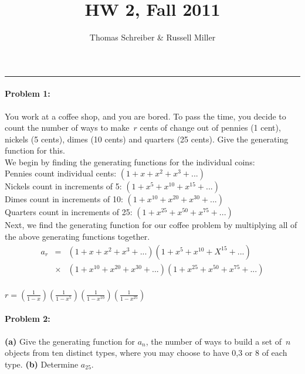 \documentclass{article}
\author{Thomas Schreiber \& Russell Miller}
\title{HW 2, Fall 2011}
\begin{document}
\maketitle
\begin{center}
\hrule
\end{center}
\vspace*{1ex}

\paragraph{Problem 1:} You work at a coffee shop, and you are bored.
To pass the time, you decide to count the number of ways to make~$r$
cents of change out of pennies (1 cent), nickels (5 cents), dimes (10
cents) and quarters (25 cents).  Give the generating function for this. \\

We begin by finding the generating functions for the individual coins: \\

Pennies count individual cents: ${(1 + x + x^2 + x^3 + ...)}$ \\

Nickels count in increments of 5: ${(1 + x^5 + x^{10} + x^{15} + ...)}$ \\

Dimes count in increments of 10: ${(1 + x^{10} + x^{20} + x^{30} + ...)}$ \\

Quarters count in increments of 25: ${(1 + x^{25} + x^{50} + x^{75} + ...)}$ \\

Next, we find the generating function for our coffee problem by multiplying all of the above generating functions together. \\

\begin{eqnarray*}
  a_r & = & (1 + x + x^2 + x^3 + ...) (1 + x^5 + x^{10} + X^{15} + ...) \\
    & \times & (1 + x^{10} + x^{20} + x^{30} + ...) (1 + x^{25} + x^{50} + x^{75} + ...) \\
\end{eqnarray*}

\begin{center}
  ${\boxed{ r = ( \frac{1}{1 - x} ) ( \frac{1}{1 - x^{5}} ) ( \frac{1}{1 - x^{10}} ) ( \frac{1}{1 - x^{25}} ) } }$
\end{center}

\paragraph{Problem 2:} \textbf{(a)} Give the generating function for $a_n$, the
number of ways to build a set of~$n$ objects from ten distinct types,
where you may choose to have 0,3 or 8 of each type.  \textbf{(b)}
Determine $a_{25}$. \\
\end{document}
